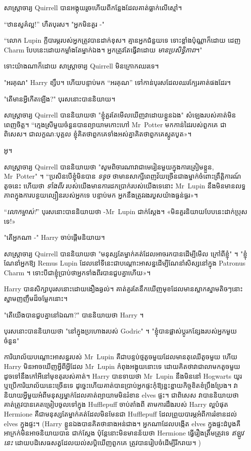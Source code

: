 សាស្រ្តាចារ្យ Quirrell បានអង្គុយរួចហើយពីកន្លែងដែលគាត់ធ្លាក់លើស្មៅ។

“ឋានសួគ៌ល្អ!” ហឺតបុរស។ "អ្នកមិនគួរ -"

“លោក Lupin ក្តីបារម្ភរបស់អ្នកត្រូវបានដាក់ខុស។ គ្មានអ្នកជំនួយទេ ទោះខ្លាំងប៉ុណ្ណាក៏ដោយ ដេញ Charm បែបនេះដោយកម្លាំងតែម្នាក់ឯង។ អ្នកត្រូវតែធ្វើវាដោយ \emph{មានប្រសិទ្ធិភាព}។"

ទោះយ៉ាងណាក៏ដោយ សាស្រ្តាចារ្យ Quirrell មិនក្រោកឈរទេ។

"អរគុណ" Harry ខ្សឹប។ ហើយបន្ទាប់មក “អរគុណ” ទៅកាន់បុរសដែលឈរក្បែរគាត់ផងដែរ។

"តើមានអ្វីកើតឡើង?" បុរសនោះបាននិយាយ។

សាស្ត្រាចារ្យ Quirrell បាននិយាយថា "ខ្ញុំគួរតែមើលឃើញវាដោយខ្លួនឯង" សំឡេងរបស់គាត់មិនពេញចិត្ត។ “ក្មេងស្រីមួយចំនួនបានព្យាយាមកោះហៅ Mr~Potter មកកាន់ដៃរបស់ពួកគេ ជាពិសេស។ ជា​លក្ខណៈ​បុគ្គល ខ្ញុំ​គិត​ថា​ពួកគេ​ទាំង​អស់​គ្នា​គិត​ថា​ពួកគេ​ស្លូតបូត»។

អូ។

សាស្រ្តាចារ្យ Quirrell បាននិយាយថា "សូមពិចារណាវាជាមេរៀនមួយក្នុងការត្រៀមខ្លួន, Mr~Potter" ។ “ប្រសិនបើខ្ញុំមិនបាន \emph{ទទូច} ថាមានសាក្សីពេញវ័យច្រើនជាងម្នាក់ចំពោះព្រឹត្តិការណ៍តូចនេះ ហើយថា \emph{ទាំងពីរ} របស់យើងមានការដកប្រាក់របស់យើងទេនោះ Mr~Lupin នឹងមិនមានលទ្ធភាពក្នុងការបន្ថយល្បឿនរបស់អ្នកទេ បន្ទាប់​មក អ្នក​នឹង​ត្រូវ​រង​របួស​យ៉ាង​ធ្ងន់ធ្ងរ»។

“\emph{លោកម្ចាស់!}” បុរសនោះបាននិយាយថា -Mr~Lupin ជាក់ស្តែង។ «មិនគួរនិយាយបែបនេះដាក់ប្រុសទេ!»

"តើអ្នកណា -" Harry ចាប់ផ្តើមនិយាយ។

សាស្ត្រាចារ្យ Quirrell បាននិយាយថា "មនុស្សតែម្នាក់គត់ដែលអាចរកបានដើម្បីមើល ក្រៅពីខ្ញុំ" ។ "ខ្ញុំណែនាំអ្នកឱ្យ Remus Lupin ដែលនៅទីនេះជាបណ្ដោះអាសន្នដើម្បីណែនាំសិស្សនៅក្នុង Patronus Charm ។ ទោះ​បី​ជា​ខ្ញុំ​ប្រាប់​ថា​អ្នក​ទាំង​ពីរ​បាន​ជួប​គ្នា​ហើយ»។

Harry បានសិក្សាបុរសនោះដោយងឿងឆ្ងល់។ គាត់​គួរ​តែ​នឹក​ឃើញ​មុខ​ដែល​មាន​ស្លាកស្នាម​តិចៗ​នោះ ស្នាម​ញញឹម​ដ៏​ចម្លែក​នោះ។

"តើយើងបានជួបគ្នានៅឯណា?" បាននិយាយថា Harry ។

បុរសនោះបាននិយាយថា "នៅក្នុងប្រហោងរបស់ Godric" ។ "ខ្ញុំបានផ្លាស់ប្តូរកន្សែងរបស់អ្នកមួយចំនួន"

\later

ការិយាល័យបណ្ដោះអាសន្នរបស់ Mr~Lupin គឺជាបន្ទប់ថ្មតូចមួយដែលមានតុឈើតូចមួយ ហើយ Harry មិនអាចឃើញអ្វីពីអ្វីដែល Mr~Lupin កំពុងអង្គុយនោះទេ ដោយគិតថាវាជាលាមកតូចមួយ ដូចទៅនឹងកៅអីនៅមុខតុរបស់គាត់។ Harry បានទាយថា Mr~Lupin នឹងមិននៅ Hogwarts យូរ ឬប្រើការិយាល័យនេះច្រើនទេ ដូច្នេះហើយគាត់បានប្រាប់អ្នកផ្ទះកុំឱ្យខ្ជះខ្ជាយកិច្ចខិតខំប្រឹងប្រែង។ វានិយាយអ្វីមួយអំពីមនុស្សម្នាក់ដែលគាត់ព្យាយាមមិនរំខាន elves ផ្ទះ។ ជាពិសេស វាបាននិយាយថា គាត់ត្រូវបានគេតម្រៀបចូលទៅក្នុង Hufflepuff ចាប់តាំងពី តាមការដឹងរបស់ Harry ល្អបំផុត Hermione គឺជាមនុស្សតែម្នាក់គត់ដែលមិនមែនជា Hufflepuff ដែលព្រួយបារម្ភអំពីការរំខានដល់ elves ក្នុងផ្ទះ។ (Harry ខ្លួនឯងបានគិតថានាងអន់ជាង។ អ្នកណាដែលបង្កើត elves ក្នុងផ្ទះដំបូងគឺអាក្រក់មិនអាចនិយាយបាន ជាក់ស្តែង ប៉ុន្តែនោះមិនមានន័យថា Hermione ធ្វើរឿងត្រឹមត្រូវទេ \emph{ឥឡូវនេះ} ដោយបដិសេធសត្វដែលយល់សប្តិឃើញពួកគេ ត្រូវបានរៀបចំដើម្បីរីករាយ។ )

